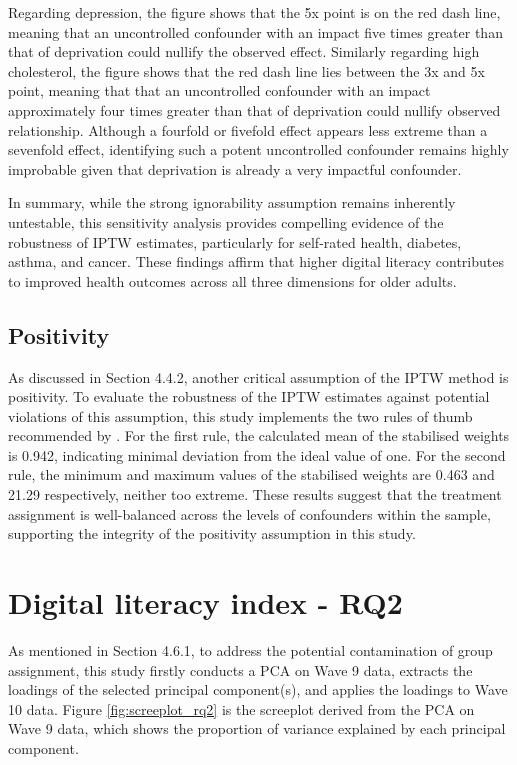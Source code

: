 Regarding depression, the figure shows that the 5x point is on the red dash line, meaning that an uncontrolled confounder with an impact five times greater than that of deprivation could nullify the observed effect. Similarly regarding high cholesterol, the figure shows that the red dash line lies between the 3x and 5x point, meaning that that an uncontrolled confounder with an impact approximately four times greater than that of deprivation could nullify observed relationship. Although a fourfold or fivefold effect appears less extreme than a sevenfold effect, identifying such a potent uncontrolled confounder remains highly improbable given that deprivation is already a very impactful confounder. 

In summary, while the strong ignorability assumption remains inherently untestable, this sensitivity analysis provides compelling evidence of the robustness of IPTW estimates, particularly for self-rated health, diabetes, asthma, and cancer. These findings affirm that higher digital literacy contributes to improved health outcomes across all three dimensions for older adults.

\subsection{Positivity}
As discussed in Section 4.4.2, another critical assumption of the IPTW method is positivity. To evaluate the robustness of the IPTW estimates against potential violations of this assumption, this study implements the two rules of thumb recommended by \textcite{cole_constructing_2008}. For the first rule, the calculated mean of the stabilised weights is 0.942, indicating minimal deviation from the ideal value of one. For the second rule, the minimum and maximum values of the stabilised weights are 0.463 and 21.29 respectively, neither too extreme. These results suggest that the treatment assignment is well-balanced across the levels of confounders within the sample, supporting the integrity of the positivity assumption in this study.

\section{Digital literacy index - RQ2}
As mentioned in Section 4.6.1, to address the potential contamination of group assignment, this study firstly conducts a PCA on Wave 9 data, extracts the loadings of the selected principal component(s), and applies the loadings to Wave 10 data. Figure \ref{fig:screeplot_rq2} is the screeplot derived from the PCA on Wave 9 data, which shows the proportion of variance explained by each principal component. 

